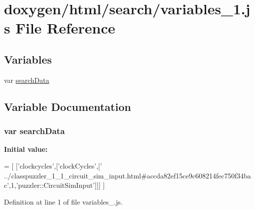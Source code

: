 \hypertarget{a00105}{}\section{doxygen/html/search/variables\+\_\+1.js File Reference}
\label{a00105}
\subsection*{Variables}
\begin{DoxyCompactItemize}
\item 
var \hyperlink{a00105_ad01a7523f103d6242ef9b0451861231e}{search\+Data}
\end{DoxyCompactItemize}


\subsection{Variable Documentation}
\hypertarget{a00105_ad01a7523f103d6242ef9b0451861231e}{}
\subsubsection[{search\+Data}]{\setlength{\rightskip}{0pt plus 5cm}var search\+Data}\label{a00105_ad01a7523f103d6242ef9b0451861231e}
{\bfseries Initial value\+:}
\begin{DoxyCode}
=
[
  [\textcolor{stringliteral}{'clockcycles'},[\textcolor{stringliteral}{'clockCycles'},[\textcolor{stringliteral}{'
      ../classpuzzler\_1\_1\_circuit\_sim\_input.html#accda82ef15ce9c608214fec750f34bac'},1,\textcolor{stringliteral}{'puzzler::CircuitSimInput'}]]]
]
\end{DoxyCode}


Definition at line 1 of file variables\+\_.\+js.

